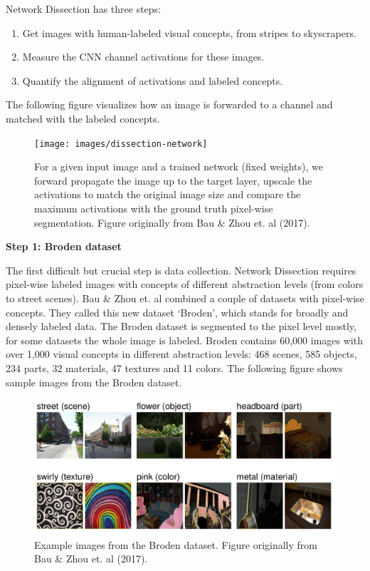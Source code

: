 \documentclass[12pt,]{krantz}
\providecommand{\tightlist}{%
  \setlength{\itemsep}{0pt}\setlength{\parskip}{0pt}}
\begin{document}
Network Dissection has three steps:

\begin{enumerate}
\def\labelenumi{\arabic{enumi}.}
\tightlist
\item
  Get images with human-labeled visual concepts, from stripes to
  skyscrapers.
\item
  Measure the CNN channel activations for these images.
\item
  Quantify the alignment of activations and labeled concepts.
\end{enumerate}

The following figure visualizes how an image is forwarded to a channel
and matched with the labeled concepts.

\begin{figure}

{\centering \texttt{[image: images/dissection-network]} 

}

\caption{For a given input image and a trained network (fixed weights), we forward propagate the image up to the target layer, upscale the activations to match the original image size and compare the maximum activations with the ground truth pixel-wise segmentation. Figure originally from Bau \& Zhou et. al (2017).}\label{fig:unnamed-chunk-54}
\end{figure}

\textbf{Step 1: Broden dataset}

The first difficult but crucial step is data collection. Network
Dissection requires pixel-wise labeled images with concepts of different
abstraction levels (from colors to street scenes). Bau \& Zhou et. al
combined a couple of datasets with pixel-wise concepts. They called this
new dataset `Broden', which stands for broadly and densely labeled data.
The Broden dataset is segmented to the pixel level mostly, for some
datasets the whole image is labeled. Broden contains 60,000 images with
over 1,000 visual concepts in different abstraction levels: 468 scenes,
585 objects, 234 parts, 32 materials, 47 textures and 11 colors. The
following figure shows sample images from the Broden dataset.

\begin{figure}

{\centering \includegraphics[width=\textwidth]{images/broden} 

}

\caption{Example images from the Broden dataset. Figure originally from Bau \& Zhou et. al (2017).}\label{fig:unnamed-chunk-55}
\end{figure}
\end{document}
